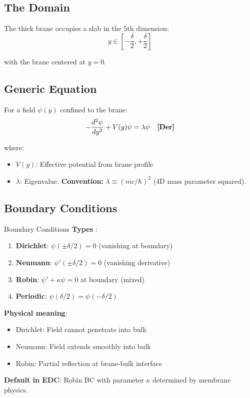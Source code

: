 \subsection{The Domain}

The thick brane occupies a slab in the 5th dimension:
\begin{equation}
y \in \left[-\frac{\delta}{2}, +\frac{\delta}{2}\right]
\end{equation}

with the brane centered at $y = 0$.

\subsection{Generic Equation}

For a field $\psi(y)$ confined to the brane:
\begin{equation}
-\frac{d^2\psi}{dy^2} + V(y)\psi = \lambda \psi \quad \textbf{[Der]}
\label{eq:bvp_generic}
\end{equation}

where:
\begin{itemize}[nosep]
\item $V(y)$: Effective potential from brane profile
\item $\lambda$: Eigenvalue. \textbf{Convention:} $\lambda \equiv (mc/\hbar)^2$ (4D mass parameter squared).
\end{itemize}

\subsection{Boundary Conditions}

\begin{mechanism}{Boundary Conditions}
\textbf{Types} \tagP{}:
\begin{enumerate}[nosep]
\item \textbf{Dirichlet}: $\psi(\pm\delta/2) = 0$ (vanishing at boundary)
\item \textbf{Neumann}: $\psi'(\pm\delta/2) = 0$ (vanishing derivative)
\item \textbf{Robin}: $\psi' + \kappa\psi = 0$ at boundary (mixed)
\item \textbf{Periodic}: $\psi(\delta/2) = \psi(-\delta/2)$
\end{enumerate}

\textbf{Physical meaning}:
\begin{itemize}[nosep]
\item Dirichlet: Field cannot penetrate into bulk
\item Neumann: Field extends smoothly into bulk
\item Robin: Partial reflection at brane-bulk interface
\end{itemize}

\textbf{Default in EDC}: Robin BC with parameter $\kappa$ determined by
membrane physics.
\end{mechanism}

